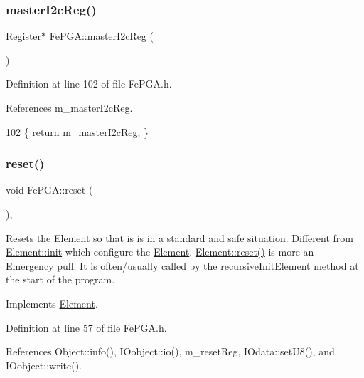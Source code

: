 \subsubsection{\texorpdfstring{master\+I2c\+Reg()}{masterI2cReg()}}
{\footnotesize\ttfamily \hyperlink{classRegister}{Register}$\ast$ Fe\+P\+G\+A\+::master\+I2c\+Reg (\begin{DoxyParamCaption}{ }\end{DoxyParamCaption})\hspace{0.3cm}{\ttfamily [inline]}}



Definition at line 102 of file Fe\+P\+G\+A.\+h.



References m\+\_\+master\+I2c\+Reg.


\begin{DoxyCode}
102 \{ \textcolor{keywordflow}{return} \hyperlink{classFePGA_adb390ea8de4a6cbce648dc62e4405f32}{m\_masterI2cReg}; \}
\end{DoxyCode}
\mbox{\label{classFePGA_abdf7a9dd901351a7eafd748d35172a3c}} 
\subsubsection{\texorpdfstring{reset()}{reset()}}
{\footnotesize\ttfamily void Fe\+P\+G\+A\+::reset (\begin{DoxyParamCaption}{ }\end{DoxyParamCaption})\hspace{0.3cm}{\ttfamily [inline]}, {\ttfamily [virtual]}}

Resets the \hyperlink{classElement}{Element} so that is is in a standard and safe situation. Different from \hyperlink{classElement_af42754b5cabc198869222725218d695c}{Element\+::init} which configure the \hyperlink{classElement}{Element}. \hyperlink{classElement_a69efffa22f06909d768149715565cb56}{Element\+::reset()} is more an Emergency pull. It is often/usually called by the recursive\+Init\+Element method at the start of the program. 

Implements \hyperlink{classElement_a69efffa22f06909d768149715565cb56}{Element}.



Definition at line 57 of file Fe\+P\+G\+A.\+h.



References Object\+::info(), I\+Oobject\+::io(), m\+\_\+reset\+Reg, I\+Odata\+::set\+U8(), and I\+Oobject\+::write().




